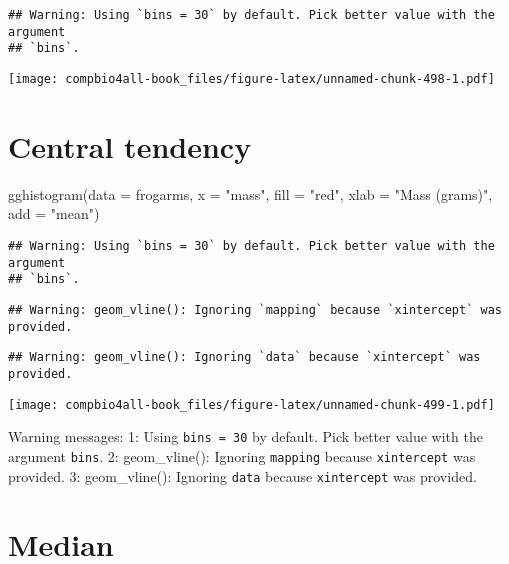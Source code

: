 \documentclass[
]{book}
\newenvironment{Shaded}{\begin{snugshade}}{\end{snugshade}}
\newcommand{\AttributeTok}[1]{\textcolor[rgb]{0.77,0.63,0.00}{#1}}
\newcommand{\FunctionTok}[1]{\textcolor[rgb]{0.00,0.00,0.00}{#1}}
\newcommand{\NormalTok}[1]{#1}
\newcommand{\StringTok}[1]{\textcolor[rgb]{0.31,0.60,0.02}{#1}}
\begin{document}
\begin{verbatim}
## Warning: Using `bins = 30` by default. Pick better value with the argument
## `bins`.
\end{verbatim}

\texttt{[image: compbio4all-book\_files/figure-latex/unnamed-chunk-498-1.pdf]}

\hypertarget{central-tendency-2}{%
\section{Central tendency}\label{central-tendency-2}}

\begin{Shaded}
\begin{Highlighting}[]
\FunctionTok{gghistogram}\NormalTok{(}\AttributeTok{data =}\NormalTok{ frogarms,}
            \AttributeTok{x =} \StringTok{"mass"}\NormalTok{,}
            \AttributeTok{fill =} \StringTok{"red"}\NormalTok{,}
            \AttributeTok{xlab =} \StringTok{"Mass (grams)"}\NormalTok{,}
            \AttributeTok{add =} \StringTok{"mean"}\NormalTok{)}
\end{Highlighting}
\end{Shaded}

\begin{verbatim}
## Warning: Using `bins = 30` by default. Pick better value with the argument
## `bins`.
\end{verbatim}

\begin{verbatim}
## Warning: geom_vline(): Ignoring `mapping` because `xintercept` was provided.
\end{verbatim}

\begin{verbatim}
## Warning: geom_vline(): Ignoring `data` because `xintercept` was provided.
\end{verbatim}

\texttt{[image: compbio4all-book\_files/figure-latex/unnamed-chunk-499-1.pdf]}

Warning messages:
1: Using \texttt{bins\ =\ 30} by default. Pick better value with the argument \texttt{bins}.
2: geom\_vline(): Ignoring \texttt{mapping} because \texttt{xintercept} was provided.
3: geom\_vline(): Ignoring \texttt{data} because \texttt{xintercept} was provided.

\hypertarget{median-1}{%
\section{Median}\label{median-1}}
\end{document}
